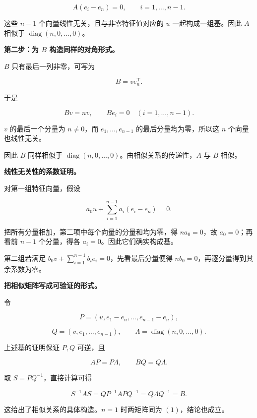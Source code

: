 \documentclass[UTF8,11pt,fontset=windows]{ctexart}
\begin{document}
$$
A(e_i-e_n)=0,\qquad i=1,\ldots,n-1.
$$

这些 $n-1$ 个向量线性无关，且与非零特征值对应的 $u$ 一起构成一组基。因此 $A$ 相似于 $\operatorname{diag}(n,0,\ldots,0)$。

\textbf{第二步：为 $B$ 构造同样的对角形式。}

$B$ 只有最后一列非零，可写为

$$
B=v e_n^{\mathrm T}.
$$

于是

$$
Bv=nv,
\qquad Be_i=0\quad(i=1,\ldots,n-1).
$$

$v$ 的最后一个分量为 $n\ne0$，而 $e_1,\ldots,e_{n-1}$ 的最后分量均为零，所以这 $n$ 个向量也线性无关。

因此 $B$ 同样相似于 $\operatorname{diag}(n,0,\ldots,0)$。由相似关系的传递性，$A$ 与 $B$ 相似。

\textbf{线性无关性的系数证明。}

对第一组特征向量，假设

$$
a_0u+\sum_{i=1}^{n-1}a_i(e_i-e_n)=0.
$$

把所有分量相加，第二项中每个向量的分量和均为零，得 $na_0=0$，故 $a_0=0$；再看前 $n-1$ 个分量，得各 $a_i=0$。因此它们确实构成基。

第二组若满足 $b_0v+\sum_{i=1}^{n-1}b_ie_i=0$，先看最后分量便得 $nb_0=0$，再逐分量得到其余系数为零。

\textbf{把相似矩阵写成可验证的形式。}

令

$$
P=(u,e_1-e_n,\ldots,e_{n-1}-e_n),
$$

$$
Q=(v,e_1,\ldots,e_{n-1}),
\qquad \Lambda=\operatorname{diag}(n,0,\ldots,0).
$$

上述基的证明保证 $P,Q$ 可逆，且

$$
AP=P\Lambda,\qquad BQ=Q\Lambda.
$$

取 $S=PQ^{-1}$，直接计算可得

$$
S^{-1}AS=QP^{-1}APQ^{-1}=Q\Lambda Q^{-1}=B.
$$

这给出了相似关系的具体构造。$n=1$ 时两矩阵同为 $(1)$，结论也成立。
\end{document}
